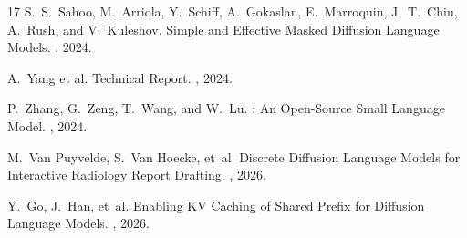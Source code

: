 \documentclass{article}
\begin{document}
\begin{thebibliography}{17}
S.~S.~Sahoo, M.~Arriola, Y.~Schiff, A.~Gokaslan, E.~Marroquin, J.~T.~Chiu, A.~Rush,
and V.~Kuleshov.
\newblock Simple and Effective Masked Diffusion Language Models.
, 2024.

A.~Yang et al.
 Technical Report.
, 2024.

P.~Zhang, G.~Zeng, T.~Wang, and W.~Lu.
: An Open-Source Small Language Model.
, 2024.

M.~Van Puyvelde, S.~Van Hoecke, et~al.
\newblock Discrete Diffusion Language Models for Interactive Radiology Report Drafting.
, 2026.

Y.~Go, J.~Han, et~al.
\newblock Enabling {KV} Caching of Shared Prefix for Diffusion Language Models.
, 2026.

\end{thebibliography}
\end{document}

